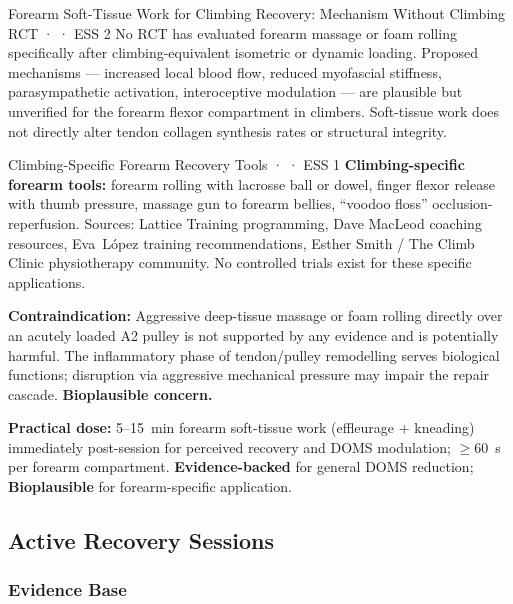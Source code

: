 \begin{bioplausbox}{Forearm Soft-Tissue Work for Climbing Recovery: Mechanism Without Climbing RCT · \bioplausible · ESS 2}
No RCT has evaluated forearm massage or foam rolling specifically after climbing-equivalent isometric or dynamic loading. Proposed mechanisms --- increased local blood flow, reduced myofascial stiffness, parasympathetic activation, interoceptive modulation --- are plausible but unverified for the forearm flexor compartment in climbers. Soft-tissue work does not directly alter tendon collagen synthesis rates or structural integrity.
\end{bioplausbox}

\begin{folklorebox}{Climbing-Specific Forearm Recovery Tools · \folkloreverified · ESS 1}
\textbf{Climbing-specific forearm tools:} forearm rolling with lacrosse ball or dowel, finger flexor release with thumb pressure, massage gun to forearm bellies, ``voodoo floss'' occlusion-reperfusion. Sources: Lattice Training programming, Dave MacLeod coaching resources, Eva~L\'opez training recommendations, Esther Smith / The Climb Clinic physiotherapy community. No controlled trials exist for these specific applications.
\end{folklorebox}

\textbf{Contraindication:} Aggressive deep-tissue massage or foam rolling directly over an acutely loaded A2 pulley is not supported by any evidence and is potentially harmful. The inflammatory phase of tendon/pulley remodelling serves biological functions; disruption via aggressive mechanical pressure may impair the repair cascade. \textbf{Bioplausible concern.}

\textbf{Practical dose:} 5--15~min forearm soft-tissue work (effleurage + kneading) immediately post-session for perceived recovery and DOMS modulation; $\geq$60~s per forearm compartment. \textbf{Evidence-backed} for general DOMS reduction; \textbf{Bioplausible} for forearm-specific application.

\subsection{Active Recovery Sessions}

\subsubsection*{Evidence Base}

